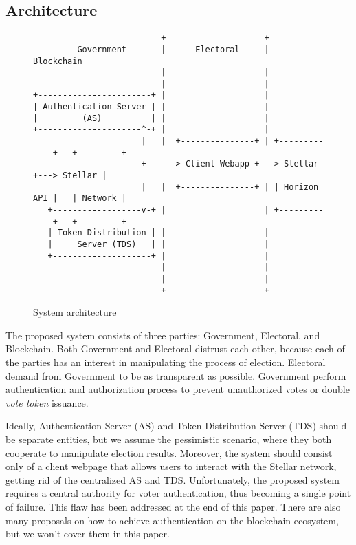 \documentclass[runningheads]{llncs}
\begin{document}
\subsection{Architecture}
\begin{figure}
\begin{verbatim}
                          +                    +
         Government       |      Electoral     |      Blockchain
                          |                    |
                          |                    |
+-----------------------+ |                    |
| Authentication Server | |                    |
|         (AS)          | |                    |
+---------------------^-+ |                    |
                      |   |  +---------------+ | +-------------+   +---------+
                      +------> Client Webapp +---> Stellar     +---> Stellar |
                      |   |  +---------------+ | | Horizon API |   | Network |
   +------------------v-+ |                    | +-------------+   +---------+
   | Token Distribution | |                    |
   |     Server (TDS)   | |                    |
   +--------------------+ |                    |
                          |                    |
                          |                    |
                          +                    +
\end{verbatim}
\caption{System architecture}
\label{fig:ascii-box}
\end{figure} 

The proposed system consists of three parties: Government, Electoral, and Blockchain. Both Government and Electoral distrust each other, because each of the parties has an interest in manipulating the process of election. Electoral demand from Government to be as transparent as possible. Government perform authentication and authorization process to prevent unauthorized votes or double \textit{vote token} issuance.

Ideally, Authentication Server (AS) and Token Distribution Server (TDS) should be separate entities, but we assume the pessimistic scenario, where they both cooperate to manipulate election results. Moreover, the system should consist only of a client webpage that allows users to interact with the Stellar network, getting rid of the centralized AS and TDS. Unfortunately, the proposed system requires a central authority for voter authentication, thus becoming a single point of failure. This flaw has been addressed at the end of this paper. There are also many proposals on how to achieve authentication on the blockchain ecosystem, but we won't cover them in this paper.
\end{document}
